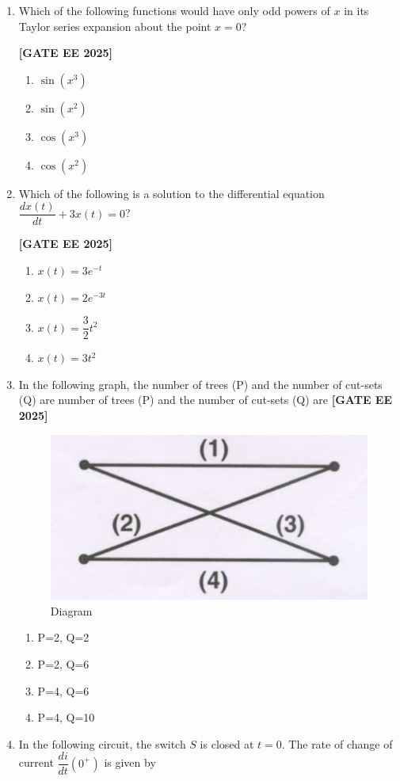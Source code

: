 \documentclass[12pt]{article}
\begin{document}
\begin{enumerate}[leftmargin=2.5em, label=\textbf{Q.\arabic*}., itemsep=2em]
\item Which of the following functions would have only odd powers of $x$ in its Taylor series expansion about the point $x = 0$?
 
\noindent \textbf{[GATE EE 2025]}
    \begin{enumerate}
        \item $\sin(x^3)$
        \item $\sin(x^2)$
        \item $\cos(x^3)$
        \item $\cos(x^2)$
    \end{enumerate}

\item Which of the following is a solution to the differential equation $\dfrac{dx(t)}{dt} + 3x(t) = 0$?
 
\noindent \textbf{[GATE EE 2025]}
    \begin{enumerate}
        \item $x(t) = 3e^{-t}$
        \item $x(t) = 2e^{-3t}$
        \item $x(t) = \dfrac{3}{2} t^2$
        \item $x(t) = 3t^2$
    \end{enumerate}

\item In the following graph, the number of trees (P) and the number of cut-sets (Q) are
number of trees (P) and the number of cut-sets (Q) are
\noindent \textbf{[GATE EE 2025]}
\begin{figure}[H]\centering
\includegraphics[width=0.5\columnwidth]{figs/q7.png}
\caption{Diagram}
\label{fig:q7}
\end{figure}
    \begin{enumerate}
        \item P=2, Q=2
        \item P=2, Q=6
        \item P=4, Q=6
        \item P=4, Q=10
    \end{enumerate}

\item In the following circuit, the switch $S$ is closed at $t = 0$. The rate of change of current $\dfrac{di}{dt}(0^+)$ is given by
 

\end{enumerate}
\end{document}
